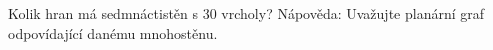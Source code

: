 \subsubsection{}
Kolik hran má sedmnáctistěn s 30 vrcholy? Nápověda: Uvažujte planární graf
odpovídající danému mnohostěnu.
